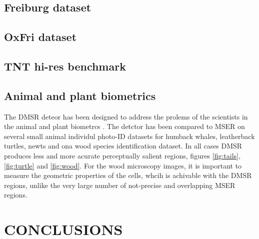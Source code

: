 \documentclass{article}
\begin{document}
\subsection{Freiburg dataset}
\label{ssec:freiburg}
\subsection{OxFri dataset}
\label{ssec:combined}
\subsection{TNT hi-res benchmark}
\label{ssec:tnt}
\subsection{Animal and plant biometrics}
\label{ssec:bio}
The DMSR deteor has been designed to address the prolems of the scientists in the animal and plant biometrcs \cite{Kuehl2013}. The detctor has been compared to MSER on several small animal individul photo-ID datasets for humback whales, leatherback turtles, newts and ona wood species identification dataset. In all cases DMSR produces less and more acurate perceptually salient regions, figures \ref{fig:tails}, \ref{fig:turtle} and \ref{fig:wood}. For the wood microscopy images, it is important to measure the geometric properties of the cells, whcih is achivable with the DMSR regions, unlike the very large number of not-precise and overlapping MSER regions.

\section{CONCLUSIONS}
\label{sec:concl}










\end{document}
